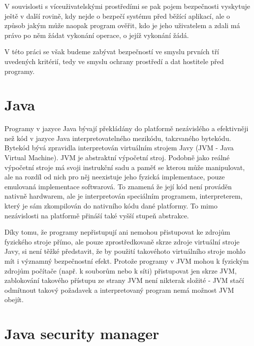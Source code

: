 V souvislosti s víceuživatelskými prostředími se pak pojem bezpečnosti vyskytuje ještě v další rovině, kdy nejde o bezpečí systému před běžící aplikací, ale o způsob jakým může naopak program ověřit, kdo je jeho uživatelem a zdali má právo po něm žádat vykonání operace, o jejíž vykonání žádá.

V této práci se však budeme zabývat bezpečností ve smyslu prvních tří uvedených kritérií, tedy ve smyslu ochrany prostředí a dat hostitele před programy.

\section{Java}

Programy v jazyce Java bývají překládány do platformě nezávislého a efektivněji než kód v jazyce Java interpretovatelného mezikódu, takzvaného bytekódu.
Bytekód bývá zpravidla interpretován virtuálním strojem Javy (JVM - Java Virtual Machine).
JVM je abstraktní výpočetní stroj. Podobně jako reálné výpočetní stroje má svoji instrukční sadu a paměť se kterou může manipulovat, ale na rozdíl od nich pro něj neexistuje jeho fyzická implementace, pouze emulovaná implementace softwarová.
To znamená že její kód není prováděn nativně hardwarem, ale je interpretován speciálním programem, interpreterem, který je sám zkompilován do nativního kódu dané platformy.
To mimo nezávislosti na platformě přináší také vyšší stupeň abstrakce.

Díky tomu, že programy nepřistupují ani nemohou přistupovat ke zdrojům fyzického stroje přímo, ale pouze zprostředkovaně skrze zdroje virtuální stroje Javy, si není těžké představit, že by použití takovéhoto virtuálního stroje mohlo mít i významný bezpečnostní efekt.
Protože programy v JVM mohou k fyzickým zdrojům počítače (např. k souborům nebo k síti) přistupovat jen skrze JVM, zablokování takového přístupu ze strany JVM není nikterak složité - JVM stačí odmítnout takový požadavek a interpretovaný program nemá možnost JVM obejít.

\section{Java security manager} \label{securityManager}

